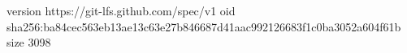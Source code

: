 version https://git-lfs.github.com/spec/v1
oid sha256:ba84cec563eb13ae13c63e27b846687d41aac992126683f1c0ba3052a604f61b
size 3098
